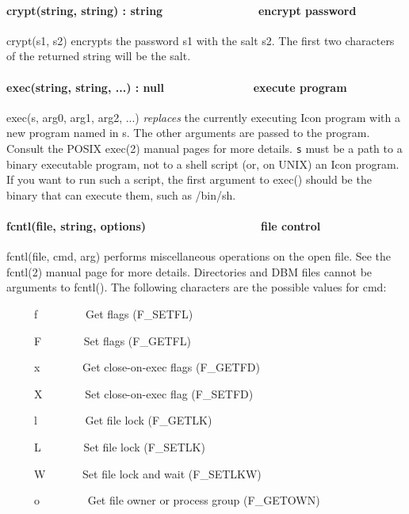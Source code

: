 \paragraph[crypt(string, string) : string\ \ \ \ \ \ \ \ \ \ \ \ 
\ \ \ encrypt password]{crypt(string, string) :
string\ \ \ \ \ \ \ \ \ \ \ \  \ \ \ encrypt password}
crypt(s1, s2) encrypts the password s1 with the salt s2. The first two
characters of the returned string will be the salt.

\paragraph[exec(string, string, ...) : null\ \ \ \ \ \ \ \ \ \ 
\ \ \ \ execute program]{exec(string, string, ...) :
null\ \ \ \ \ \ \ \ \ \  \ \ \ \ execute program}
exec(s, arg0, arg1, arg2, ...) \textit{replaces} the currently executing
Icon program with a new program named in s. The other arguments are
passed to the program. Consult the POSIX exec(2) manual pages for more
details. \texttt{s} must be a path to a binary executable program, not
to a shell script (or, on UNIX) an Icon program. If you want to run
such a script, the first argument to exec() should be the binary that
can execute them, such as /bin/sh.

\paragraph[fcntl(file, string, options)\ \ \ \ \ \ \ \ \ \ \ \ \ \ 
\ \ \ \ file control]{fcntl(file, string,
options)\ \ \ \ \ \ \ \ \ \ \ \ \ \  \ \ \ \ file control}
fcntl(file, cmd, arg) performs miscellaneous operations on the open
file. See the fcntl(2) manual page for more details. Directories and
DBM files cannot be arguments to fcntl(). The following characters are
the possible values for cmd: 

\ \ \ \ \ f \ \ \ \ \ \ \ \ Get flags (F\_SETFL)

\ \ \ \ \ F \ \ \ \ \ \ \ Set flags (F\_GETFL)

\ \ \ \ \ x \ \ \ \ \ \ \ Get close-on-exec flags (F\_GETFD)

\ \ \ \ \ X \ \ \ \ \ \ \ Set close-on-exec flag (F\_SETFD)

\ \ \ \ \ l \ \ \ \ \ \ \ \ Get file lock (F\_GETLK)

\ \ \ \ \ L \ \ \ \ \ \ \ Set file lock (F\_SETLK)

\ \ \ \ \ W \ \ \ \ \ \ Set file lock and wait (F\_SETLKW)

\ \ \ \ \ o \ \ \ \ \ \ \ \ Get file owner or process group (F\_GETOWN)

